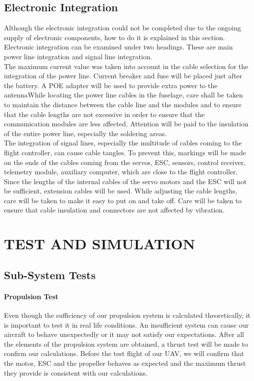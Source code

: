 \documentclass[12pt]{article}
\begin{document}

\subsection{Electronic Integration}

Although the electronic integration could not be completed due to the ongoing supply of electronic components, how to do it is explained in this section. Electronic integration can be examined under two headings. These are main power line integration and signal line integration.\\

The maximum current value was taken into account in the cable selection for the integration of the power line. Current breaker and fuse will be placed just after the battery. A POE adapter will be used to provide extra power to the antennaWhile locating the power line cables in the fuselage, care shall be taken to maintain the distance between the cable line and the modules and to ensure that the cable lengths are not excessive in order to ensure that the communication modules are less affected. Attention will be paid to the insulation of the entire power line, especially the soldering areas.\\

The integration of signal lines, especially the multitude of cables coming to the flight controller, can cause cable tangles. To prevent this, markings will be made on the ends of the cables coming from the servos, ESC, sensors, control receiver, telemetry module, auxiliary computer, which are close to the flight controller. Since the lengths of the internal cables of the servo motors and the ESC will not be sufficient, extension cables will be used. While adjusting the cable lengths, care will be taken to make it easy to put on and take off. Care will be taken to ensure that cable insulation and connectors are not affected by vibration.\\


\section{TEST AND SIMULATION}

\subsection{Sub-System Tests}
\paragraph*{Propulsion Test} Even though the sufficiency of our propulsion system is calculated theoretically, it is important to test it in real life conditions. An insufficient system can cause our aircraft to behave unexpectedly or it may not satisfy our expectations. After all the elements of the propulsion system are obtained, a thrust test will be made to confirm our calculations. Before the test flight of our UAV, we will confirm that the motor, ESC and the propeller behaves as expected and the maximum thrust they provide is consistent with our calculations.
\end{document}
